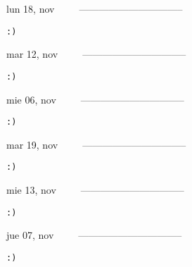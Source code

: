 \documentclass[letterpaper,10pt]{article}
\begin{document}
\begin{multicols}{3}
{lun 18, nov\ \ \ \ \ --------------------------------}
\begin{flushright}\begin{small}\texttt{:)}\end{small}\end{flushright}
\vfill
{mar 12, nov\ \ \ \ \ --------------------------------}
\begin{flushright}\begin{small}\texttt{:)}\end{small}\end{flushright}\par
\vfill
{mie 06, nov\ \ \ \ \ --------------------------------}
\begin{flushright}\begin{small}\texttt{:)}\end{small}\end{flushright}\par
\vfill
\end{multicols}
\vspace{1.05cm}

\begin{multicols}{3}
{mar 19, nov\ \ \ \ \ --------------------------------}
\begin{flushright}\begin{small}\texttt{:)}\end{small}\end{flushright}
\vfill
{mie 13, nov\ \ \ \ \ --------------------------------}
\begin{flushright}\begin{small}\texttt{:)}\end{small}\end{flushright}\par
\vfill
{jue 07, nov\ \ \ \ \ --------------------------------}
\begin{flushright}\begin{small}\texttt{:)}\end{small}\end{flushright}\par
\vfill
\end{multicols}
\vspace{1.05cm}
\end{document}

